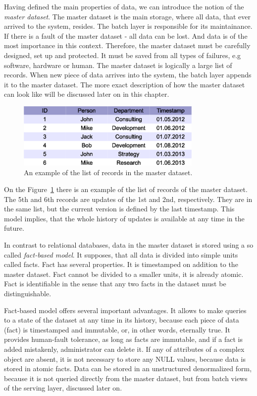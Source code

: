 Having defined the main properties of data, we can introduce the notion of the \textit{master dataset}.
The master dataset is the main storage, where all data, that ever arrived to the system, resides.
The batch layer is responsible for its maintainance.
If there is a fault of the master dataset - all data can be lost.
And data is of the most importance in this context.
Therefore, the master dataset must be carefully designed, set up and protected.
It must be saved from all types of failures, e.g software, hardware or human.
The master dataset is logically a large list of records.
When new piece of data arrives into the system, the batch layer appends it to the master dataset.
The more exact description of how the master dataset can look like will be discussed later on in this chapter.

\begin{figure}[h]
  \centering
  \includegraphics [width=0.8\textwidth]{images/MasterDatasetExample}
  \caption{An example of the list of records in the master dataset.}
  \label{fig:MasterDatasetExample}
\end{figure}

On the Figure~\ref{fig:MasterDatasetExample} there is an example of the list of records of the master dataset.
The 5th and 6th records are updates of the 1st and 2nd, respectively.
They are in the same list, but the current version is defined by the last timestamp.
This model implies, that the whole history of updates is available at any time in the future. 

In contrast to relational databases, data in the master dataset is stored using a so called \textit{fact-based model}.
It supposes, that all data is divided into simple units called facts.
Fact has several properties.
It is timestamped on addition to the master dataset.
Fact cannot be divided to a smaller units, it is already atomic.
Fact is identifiable in the sense that any two facts in the dataset must be distinguishable.

Fact-based model offers several important advantages.
It allows to make queries to a state of the dataset at any time in its history, because each piece of data (fact) is timestamped and immutable, or, in other words, eternally true.
It provides human-fault tolerance, as long as facts are immutable, and if a fact is added mistakenly, administrator can delete it.
If any of attributes of a complex object are absent, it is not necessary to store any NULL values, because data is stored in atomic facts.
Data can be stored in an unstructured denormalized form, because it is not queried directly from the master dataset, but from batch views of the serving layer, discussed later on.

